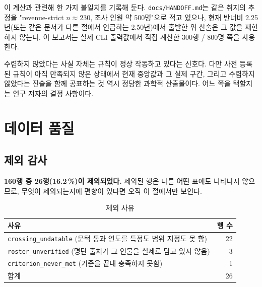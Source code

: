 \documentclass[11pt]{article}
\begin{document}
이 계산과 관련해 한 가지 불일치를 기록해 둔다.
\texttt{docs/HANDOFF.md}는 같은 취지의 추정을
"revenue-strict $n \approx 230$, 조사 인원 약 500명"으로 적고 있으나,
현재 반너비 2.25년(또는 같은 문서가 다른 절에서 언급하는 2.50년)에서 출발한
위 산술은 그 값을 재현하지 않는다.
이 보고서는 실제 CLI 출력값에서 직접 계산한 300행 / 800명 쪽을 사용한다.

수렴하지 않았다는 사실 자체는 규칙이 정상 작동하고 있다는 신호다.
다만 사전 등록된 규칙이 아직 만족되지 않은 상태에서
현재 중앙값과 그 실제 구간, 그리고 수렴하지 않았다는 진술을 함께 공표하는 것 역시
정당한 과학적 산출물이다. 어느 쪽을 택할지는 연구 저자의 결정 사항이다.

\section{데이터 품질}

\subsection{제외 감사}

\textbf{160행 중 26행(16.2\,\%)이 제외되었다.}
제외된 행은 다른 어떤 표에도 나타나지 않으므로,
무엇이 제외되는지에 편향이 있다면 오직 이 절에서만 보인다.

\begin{table}[h]
\centering
\caption{제외 사유}
\begin{tabular}{L R}
\toprule
사유 & 행 수 \\
\midrule
\texttt{crossing\_undatable} (문턱 통과 연도를 특정도 범위 지정도 못 함) & 22 \\
\texttt{roster\_unverified} (명단 출처가 그 인물을 실제로 담고 있지 않음) & \phantom{0}3 \\
\texttt{criterion\_never\_met} (기준을 끝내 충족하지 못함) & \phantom{0}1 \\
\midrule
합계 & 26 \\
\bottomrule
\end{tabular}
\end{table}
\end{document}
